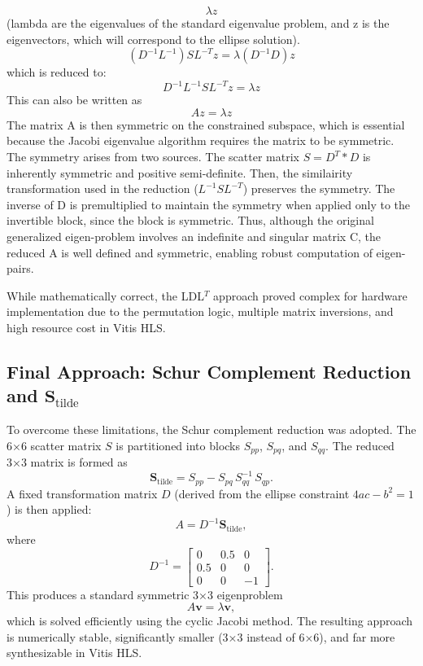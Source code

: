\begin{equation}
    \lambda z
\end{equation}
(lambda are the eigenvalues of the standard eigenvalue problem, and z is the eigenvectors, which will correspond to the ellipse solution). 
\begin{equation}
    (D^{-1}L^{-1})SL^{-T}z = \lambda (D^{-1}D)z 
\end{equation}
which is reduced to: 
\begin{equation}
    D^{-1}L^{-1}SL^{-T}z = \lambda z
\end{equation}
This can also be written as
\begin{equation}
    Az = \lambda z
\end{equation}
The matrix A is then symmetric on the constrained subspace, which is essential because the Jacobi eigenvalue algorithm requires the matrix to be symmetric. The symmetry arises from two sources. The scatter matrix $S = D^{T} * D$ is inherently symmetric and positive semi-definite. Then, the similairity transformation used in the reduction ($L^{-1} S L^{-T}$) preserves the symmetry. The inverse of D is premultiplied to maintain the symmetry when applied only to the invertible block, since the block is symmetric. Thus, although the original generalized eigen-problem involves an indefinite and singular matrix C, the reduced A is well defined and symmetric, enabling robust computation of eigen-pairs. 

While mathematically correct, the LDL$^T$ approach proved complex for hardware implementation due to the permutation logic, multiple matrix inversions, and high resource cost in Vitis HLS.

\subsection{Final Approach: Schur Complement Reduction and \(\mathbf{S}_{\text{tilde}}\)}

To overcome these limitations, the Schur complement reduction was adopted. The 6×6 scatter matrix \(S\) is partitioned into blocks \(S_{pp}\), \(S_{pq}\), and \(S_{qq}\). The reduced 3×3 matrix is formed as
\[
\mathbf{S}_{\text{tilde}} = S_{pp} - S_{pq}\, S_{qq}^{-1}\, S_{qp}.
\]
A fixed transformation matrix \(D\) (derived from the ellipse constraint \(4ac - b^2 = 1\)) is then applied:
\[
A = D^{-1} \mathbf{S}_{\text{tilde}},
\]
where
\[
D^{-1} = \begin{bmatrix}
0 & 0.5 & 0 \\
0.5 & 0 & 0 \\
0 & 0 & -1
\end{bmatrix}.
\]
This produces a standard symmetric 3×3 eigenproblem
\[
A\mathbf{v} = \lambda \mathbf{v},
\]
which is solved efficiently using the cyclic Jacobi method. The resulting approach is numerically stable, significantly smaller (3×3 instead of 6×6), and far more synthesizable in Vitis HLS.

